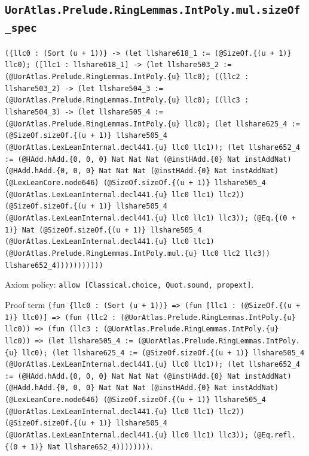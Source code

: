 \documentclass[11pt]{article}
\begin{document}
\subsection*{\texttt{UorAtlas.Prelude.RingLemmas.IntPoly.mul.sizeOf\_spec}}
\noindent\texttt{(\{llc0 : (Sort (u + 1))\} -> (let llshare618\_1 := (@SizeOf.\{(u + 1)\} llc0); ([llc1 : llshare618\_1] -> (let llshare503\_2 := (@UorAtlas.Prelude.RingLemmas.IntPoly.\{u\} llc0); ((llc2 : llshare503\_2) -> (let llshare504\_3 := (@UorAtlas.Prelude.RingLemmas.IntPoly.\{u\} llc0); ((llc3 : llshare504\_3) -> (let llshare505\_4 := (@UorAtlas.Prelude.RingLemmas.IntPoly.\{u\} llc0); (let llshare625\_4 := (@SizeOf.sizeOf.\{(u + 1)\} llshare505\_4 (@UorAtlas.LexLeanInternal.decl441.\{u\} llc0 llc1)); (let llshare652\_4 := (@HAdd.hAdd.\{0, 0, 0\} Nat Nat Nat (@instHAdd.\{0\} Nat instAddNat) (@HAdd.hAdd.\{0, 0, 0\} Nat Nat Nat (@instHAdd.\{0\} Nat instAddNat) (@LexLeanCore.node646) (@SizeOf.sizeOf.\{(u + 1)\} llshare505\_4 (@UorAtlas.LexLeanInternal.decl441.\{u\} llc0 llc1) llc2)) (@SizeOf.sizeOf.\{(u + 1)\} llshare505\_4 (@UorAtlas.LexLeanInternal.decl441.\{u\} llc0 llc1) llc3)); (@Eq.\{(0 + 1)\} Nat (@SizeOf.sizeOf.\{(u + 1)\} llshare505\_4 (@UorAtlas.LexLeanInternal.decl441.\{u\} llc0 llc1) (@UorAtlas.Prelude.RingLemmas.IntPoly.mul.\{u\} llc0 llc2 llc3)) llshare652\_4)))))))))))}\par
\noindent Axiom policy: \texttt{allow [Classical.choice, Quot.sound, propext]}.\par
\noindent Proof term \texttt{(fun \{llc0 : (Sort (u + 1))\} => (fun [llc1 : (@SizeOf.\{(u + 1)\} llc0)] => (fun (llc2 : (@UorAtlas.Prelude.RingLemmas.IntPoly.\{u\} llc0)) => (fun (llc3 : (@UorAtlas.Prelude.RingLemmas.IntPoly.\{u\} llc0)) => (let llshare505\_4 := (@UorAtlas.Prelude.RingLemmas.IntPoly.\{u\} llc0); (let llshare625\_4 := (@SizeOf.sizeOf.\{(u + 1)\} llshare505\_4 (@UorAtlas.LexLeanInternal.decl441.\{u\} llc0 llc1)); (let llshare652\_4 := (@HAdd.hAdd.\{0, 0, 0\} Nat Nat Nat (@instHAdd.\{0\} Nat instAddNat) (@HAdd.hAdd.\{0, 0, 0\} Nat Nat Nat (@instHAdd.\{0\} Nat instAddNat) (@LexLeanCore.node646) (@SizeOf.sizeOf.\{(u + 1)\} llshare505\_4 (@UorAtlas.LexLeanInternal.decl441.\{u\} llc0 llc1) llc2)) (@SizeOf.sizeOf.\{(u + 1)\} llshare505\_4 (@UorAtlas.LexLeanInternal.decl441.\{u\} llc0 llc1) llc3)); (@Eq.refl.\{(0 + 1)\} Nat llshare652\_4))))))))}.\par
\end{document}

